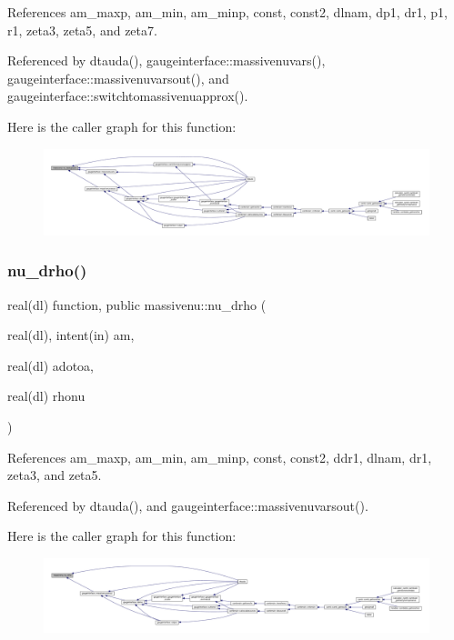 References am\+\_\+maxp, am\+\_\+min, am\+\_\+minp, const, const2, dlnam, dp1, dr1, p1, r1, zeta3, zeta5, and zeta7.



Referenced by dtauda(), gaugeinterface\+::massivenuvars(), gaugeinterface\+::massivenuvarsout(), and gaugeinterface\+::switchtomassivenuapprox().

Here is the caller graph for this function\+:
\nopagebreak
\begin{figure}[H]
\begin{center}
\leavevmode
\includegraphics[width=350pt]{namespacemassivenu_a30a55d3fc963ae76797cb114a3bd8818_icgraph}
\end{center}
\end{figure}
\mbox{\label{namespacemassivenu_a095ca5fb68fcb4e3b808e4dcf0f2f34d}} 
\subsubsection{\texorpdfstring{nu\+\_\+drho()}{nu\_drho()}}
{\footnotesize\ttfamily real(dl) function, public massivenu\+::nu\+\_\+drho (\begin{DoxyParamCaption}\item[{real(dl), intent(in)}]{am,  }\item[{real(dl)}]{adotoa,  }\item[{real(dl)}]{rhonu }\end{DoxyParamCaption})}



References am\+\_\+maxp, am\+\_\+min, am\+\_\+minp, const, const2, ddr1, dlnam, dr1, zeta3, and zeta5.



Referenced by dtauda(), and gaugeinterface\+::massivenuvarsout().

Here is the caller graph for this function\+:
\nopagebreak
\begin{figure}[H]
\begin{center}
\leavevmode
\includegraphics[width=350pt]{namespacemassivenu_a095ca5fb68fcb4e3b808e4dcf0f2f34d_icgraph}
\end{center}
\end{figure}
\mbox{\label{namespacemassivenu_acf78f8f20c4f8c680d7f239aaffbc826}} 
